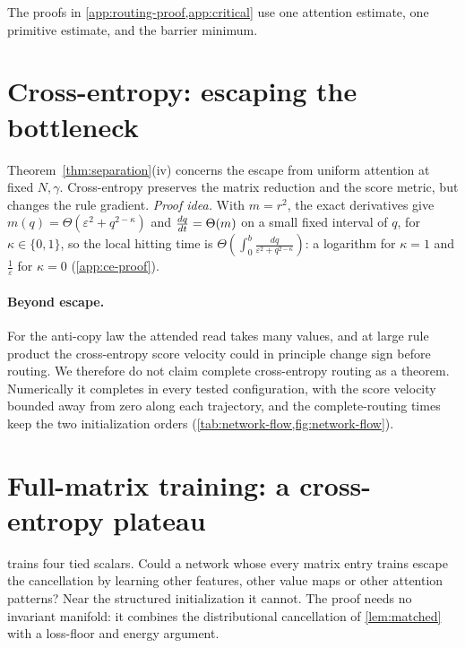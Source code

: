 The proofs in \cref{app:routing-proof,app:critical} use one attention estimate, one primitive estimate, and the barrier minimum.

\section{Cross-entropy: escaping the bottleneck}
\label{sec:crossentropy}
Theorem~\ref{thm:separation}(iv) concerns the escape from uniform attention at fixed $N,\gamma$.
Cross-entropy preserves the matrix reduction and the score metric, but changes the rule gradient.
\emph{Proof idea.} With $m=r^2$, the exact derivatives give $m(q)=\Theta(\varepsilon^2+q^{2-\kappa})$ and $\frac{d q}{d t}=\Theta(m)$ on a small fixed
interval of $q$, for $\kappa\in\{0,1\}$, so the local hitting time is $\Theta(\int_0^b\frac{dq}{\varepsilon^2+q^{2-\kappa}})$: a logarithm for $\kappa=1$
and $\tfrac{1}{\varepsilon}$ for $\kappa=0$ (\cref{app:ce-proof}).

\paragraph{Beyond escape.}
For the anti-copy law the attended read takes many values, and at large rule product the cross-entropy score velocity
could in principle change sign before routing. We therefore do not claim complete cross-entropy routing as a theorem.
Numerically it completes in every tested configuration, with the score velocity bounded away from zero along each trajectory,
and the complete-routing times keep the two initialization orders (\cref{tab:network-flow,fig:network-flow}).

\section{Full-matrix training: a cross-entropy plateau}
\label{sec:fullmatrix}
 trains four tied scalars. Could a network whose every matrix entry trains escape the cancellation by learning other features,
other value maps or other attention patterns? Near the structured initialization it cannot. The proof needs no invariant manifold:
it combines the distributional cancellation of \cref{lem:matched} with a loss-floor and energy argument.

